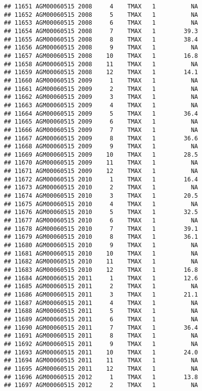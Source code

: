 \documentclass{article}\usepackage[]{graphicx}\usepackage[]{color}
\makeatletter
\newenvironment{kframe}{%
 \def\at@end@of@kframe{}%
 \ifinner\ifhmode%
  \def\at@end@of@kframe{\end{minipage}}%
  \begin{minipage}{\columnwidth}%
 \fi\fi%
 \def\FrameCommand##1{\hskip\@totalleftmargin \hskip-\fboxsep
 \colorbox{shadecolor}{##1}\hskip-\fboxsep
     \hskip-\linewidth \hskip-\@totalleftmargin \hskip\columnwidth}%
 \MakeFramed {\advance\hsize-\width
   \@totalleftmargin\z@ \linewidth\hsize
   \@setminipage}}%
 {\par\unskip\endMakeFramed%
 \at@end@of@kframe}
\newenvironment{knitrout}{}{} %
\makeatother
\begin{document}
\begin{knitrout}
\begin{kframe}
\begin{verbatim}
## 11651 AGM00060515 2008     4    TMAX   1          NA
## 11652 AGM00060515 2008     5    TMAX   1          NA
## 11653 AGM00060515 2008     6    TMAX   1          NA
## 11654 AGM00060515 2008     7    TMAX   1        39.3
## 11655 AGM00060515 2008     8    TMAX   1        38.4
## 11656 AGM00060515 2008     9    TMAX   1          NA
## 11657 AGM00060515 2008    10    TMAX   1        16.8
## 11658 AGM00060515 2008    11    TMAX   1          NA
## 11659 AGM00060515 2008    12    TMAX   1        14.1
## 11660 AGM00060515 2009     1    TMAX   1          NA
## 11661 AGM00060515 2009     2    TMAX   1          NA
## 11662 AGM00060515 2009     3    TMAX   1          NA
## 11663 AGM00060515 2009     4    TMAX   1          NA
## 11664 AGM00060515 2009     5    TMAX   1        36.4
## 11665 AGM00060515 2009     6    TMAX   1          NA
## 11666 AGM00060515 2009     7    TMAX   1          NA
## 11667 AGM00060515 2009     8    TMAX   1        36.6
## 11668 AGM00060515 2009     9    TMAX   1          NA
## 11669 AGM00060515 2009    10    TMAX   1        28.5
## 11670 AGM00060515 2009    11    TMAX   1          NA
## 11671 AGM00060515 2009    12    TMAX   1          NA
## 11672 AGM00060515 2010     1    TMAX   1        16.4
## 11673 AGM00060515 2010     2    TMAX   1          NA
## 11674 AGM00060515 2010     3    TMAX   1        20.5
## 11675 AGM00060515 2010     4    TMAX   1          NA
## 11676 AGM00060515 2010     5    TMAX   1        32.5
## 11677 AGM00060515 2010     6    TMAX   1          NA
## 11678 AGM00060515 2010     7    TMAX   1        39.1
## 11679 AGM00060515 2010     8    TMAX   1        36.1
## 11680 AGM00060515 2010     9    TMAX   1          NA
## 11681 AGM00060515 2010    10    TMAX   1          NA
## 11682 AGM00060515 2010    11    TMAX   1          NA
## 11683 AGM00060515 2010    12    TMAX   1        16.8
## 11684 AGM00060515 2011     1    TMAX   1        12.6
## 11685 AGM00060515 2011     2    TMAX   1          NA
## 11686 AGM00060515 2011     3    TMAX   1        21.1
## 11687 AGM00060515 2011     4    TMAX   1          NA
## 11688 AGM00060515 2011     5    TMAX   1          NA
## 11689 AGM00060515 2011     6    TMAX   1          NA
## 11690 AGM00060515 2011     7    TMAX   1        36.4
## 11691 AGM00060515 2011     8    TMAX   1          NA
## 11692 AGM00060515 2011     9    TMAX   1          NA
## 11693 AGM00060515 2011    10    TMAX   1        24.0
## 11694 AGM00060515 2011    11    TMAX   1          NA
## 11695 AGM00060515 2011    12    TMAX   1          NA
## 11696 AGM00060515 2012     1    TMAX   1        13.8
## 11697 AGM00060515 2012     2    TMAX   1          NA

\end{verbatim}
\end{kframe}
\end{knitrout}
\end{document}

